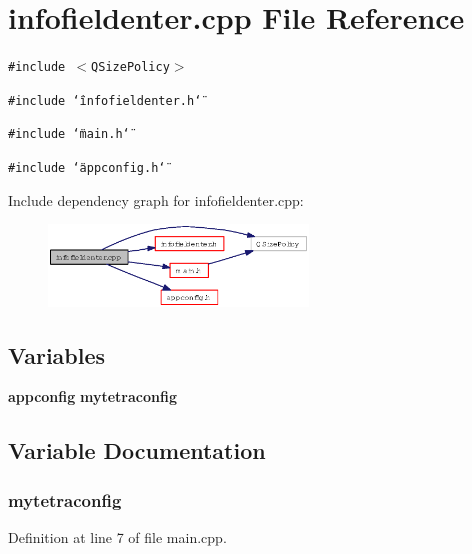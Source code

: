 \section{infofieldenter.cpp File Reference}
\label{infofieldenter_8cpp}
{\tt \#include $<$QSize\-Policy$>$}\par
{\tt \#include \char`\"{}infofieldenter.h\char`\"{}}\par
{\tt \#include \char`\"{}main.h\char`\"{}}\par
{\tt \#include \char`\"{}appconfig.h\char`\"{}}\par


Include dependency graph for infofieldenter.cpp:\begin{figure}[H]
\begin{center}
\leavevmode
\includegraphics[width=196pt]{infofieldenter_8cpp__incl}
\end{center}
\end{figure}
\subsection*{Variables}
\begin{CompactItemize}
\item 
{\bf appconfig} {\bf mytetraconfig}
\end{CompactItemize}


\subsection{Variable Documentation}
\subsubsection{ {\bf mytetraconfig}}\label{infofieldenter_8cpp_69bd0a7d678d494effdef51808501712}




Definition at line 7 of file main.cpp.